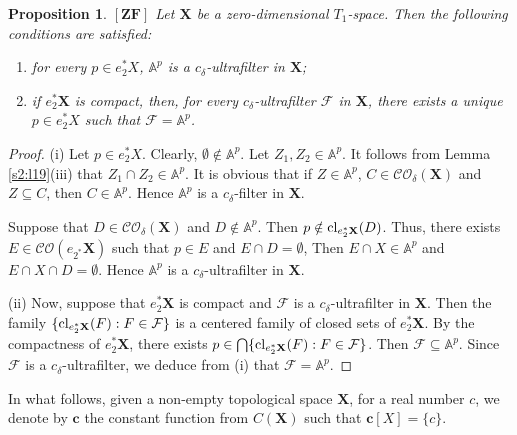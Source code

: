 \documentclass[12pt,twoside,leqno]{article}
\theoremstyle{plain}
\newtheorem{proposition}[theorem]{Proposition}
\theoremstyle{definition}
\theoremstyle{remark}
\DeclareMathOperator{\cl}{{\rm cl}}
\begin{document}
\begin{proposition}
	\label{s2:p20}
	$[\mathbf{ZF}]$ Let $\mathbf{X}$ be a zero-dimensional $T_1$-space. Then the following conditions are satisfied:
	\begin{enumerate}
		\item[(i)] for every $p\in e_{2}^{\ast} X$, $\mathbb{A}^p$ is a $c_{\delta}$-ultrafilter in $\mathbf{X}$;
		\item[(ii)] if $e_{2}^{\ast}\mathbf{X}$ is compact, then, for every $c_{\delta}$-ultrafilter $\mathcal{F}$ in $\mathbf{X}$, there exists a unique $p\in e_{2}^{\ast}X$ such that $\mathcal{F}=\mathbb{A}^p$.
	\end{enumerate}
\end{proposition}
\begin{proof}
	(i) Let $p\in e_{2}^{\ast} X$. Clearly, $\emptyset\notin \mathbb{A}^p$. Let $Z_1,Z_2\in\mathbb{A}^p$. It follows from Lemma \ref{s2:l19}(iii) that  $Z_1\cap Z_2\in \mathbb{A}^p$. It is obvious that if $Z\in\mathbb{A}^p$, $C\in\mathcal{CO}_{\delta}(\mathbf{X})$ and $Z\subseteq C$, then $C\in\mathbb{A}^p$. Hence $\mathbb{A}^{p}$ is a $c_{\delta}$-filter in $\mathbf{X}$.
	
	Suppose that $D\in\mathcal{CO}_{\delta}(\mathbf{X})$ and $D\notin\mathbb{A}^{p}$. Then $p\notin \cl_{e_{2}^{\ast}\mathbf{X}}(D)$. Thus, there exists $E\in\mathcal{CO}(e_{2^{\ast}}\mathbf{X})$ such that $p\in E$ and $E\cap D=\emptyset$, Then $E\cap X\in\mathbb{A}^{p}$ and $E\cap X\cap D=\emptyset$. Hence $\mathbb{A}^p$ is a $c_{\delta}$-ultrafilter in $\mathbf{X}$.
	
	(ii) Now, suppose that $e_{2}^{\ast}\mathbf{X}$ is compact and $\mathcal{F}$ is a $c_{\delta}$-ultrafilter in $\mathbf{X}$. Then the family $\{\cl_{e_{2}^{\ast}\mathbf{X}}(F): F\in\mathcal{F}\}$ is a centered family of closed sets of $e_{2}^{\ast}\mathbf{X}$. By the compactness of $e_{2}^{\ast}\mathbf{X}$, there exists $p\in\bigcap \{\cl_{e_{2}^{\ast}\mathbf{X}}(F): F\in\mathcal{F}\}$. Then $\mathcal{F}\subseteq\mathbb{A}^p$. Since $\mathcal{F}$ is a $c_{\delta}$-ultrafilter, we deduce from (i) that $\mathcal{F}=\mathbb{A}^p$.
\end{proof}

In what follows, given a non-empty topological space $\mathbf{X}$, for a real number $c$, we denote by $\mathbf{c}$ the constant function from $C(\mathbf{X})$ such that $\mathbf{c}[X]=\{c\}$.
\end{document}

